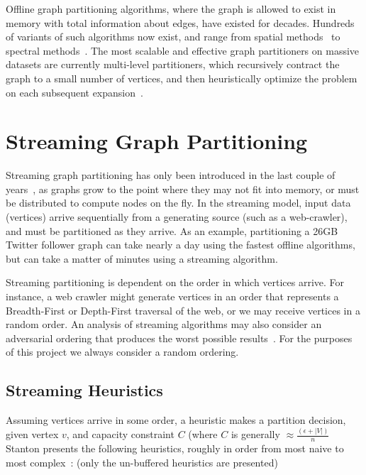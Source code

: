 \documentclass[11pt]{article}
\begin{document}

Offline graph partitioning algorithms, where the graph is allowed to exist in memory with total information about edges, have existed for decades. Hundreds of variants of such algorithms now exist, and range from spatial methods~\cite{Gilbert95geometricmesh} to spectral methods~\cite{arora2009expander}. The most scalable and effective graph partitioners on massive datasets are currently multi-level partitioners, which recursively contract the graph to a small number of vertices, and then heuristically optimize the problem on each subsequent expansion~\cite{karypis1998multilevel}. 

\section{Streaming Graph Partitioning}\vspace{-10 pt}
Streaming graph partitioning has only been introduced in the last couple of years~\cite{DBLP:journals/corr/abs-1212-1121,Stanton:2012:SGP:2339530.2339722,tsourakakis2012fennel}, as graphs grow to the point where they may not fit into memory, or must be distributed to compute nodes on the fly. In the streaming model, input data (vertices) arrive sequentially from a generating source (such as a web-crawler), and must be partitioned as they arrive. As an example, partitioning a 26GB Twitter follower graph can take nearly a day using the fastest offline algorithms, but can take a matter of minutes using a streaming algorithm.

Streaming partitioning is dependent on the order in which vertices arrive. For instance, a web crawler might generate vertices in an order that represents a Breadth-First or Depth-First traversal of the web, or we may receive vertices in a random order. An analysis of streaming algorithms may also consider an adversarial ordering that produces the worst possible results~\cite{Stanton:2012:SGP:2339530.2339722}. For the purposes of this project we always consider a random ordering. 

\subsection{Streaming Heuristics}
Assuming vertices arrive in some order, a heuristic makes a partition decision, given vertex $v$, and capacity constraint $C$ (where $C$ is generally $\approx \frac{(\epsilon+|V|)}{n}$ Stanton presents the following heuristics, roughly in order from most naive to most complex~\cite{Stanton:2012:SGP:2339530.2339722}: (only the un-buffered heuristics are presented)
\end{document}
